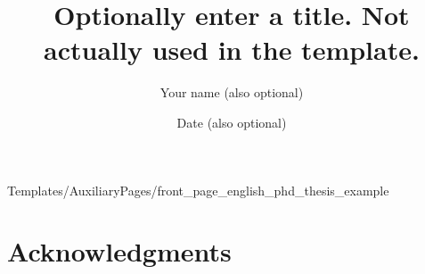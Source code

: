 \documentclass[a4paper,12pt,twoside,openany]{book}
\title{Optionally enter a title. Not actually used in the template.}
\author{Your name (also optional)}
\date{Date (also optional)}
\begin{document}
\frontmatter
\pagestyle{empty}
\clearpage

        {Templates/AuxiliaryPages/front_page_english_phd_thesis_example}

\chapter*{Acknowledgments}
    \thispagestyle{empty} %
    

    \renewcommand{\contentsname}{Table of Contents}
    \tableofcontents
    \thispagestyle{empty} %
\clearpage

    \listoffigures
    \thispagestyle{empty} %
\clearpage

    \listoftables
    \thispagestyle{empty} %
\clearpage


    \printglossary[type=\acronymtype]
    \thispagestyle{empty} %
 \clearpage

\pagestyle{fancy}
\fancyhf{} %


\end{document}
